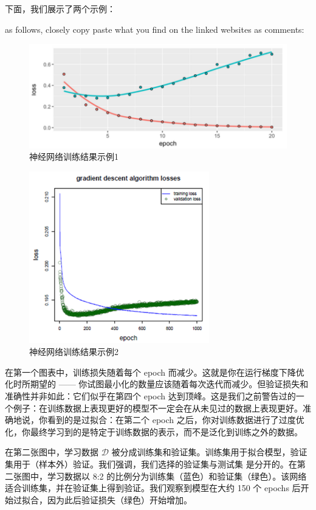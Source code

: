 \documentclass[
]{article}
\begin{document}
下面，我们展示了两个示例：

as follows, closely copy paste what you find on the linked websites as
comments:

\begin{figure}
\centering
\includegraphics{./Figs/Case2/Case2-Fig3.png}
\caption{神经网络训练结果示例1}
\end{figure}

\begin{figure}
\centering
\includegraphics{./Figs/Case2/Case2-Fig4.png}
\caption{神经网络训练结果示例2}
\end{figure}

在第一个图表中，训练损失随着每个 epoch
而减少。这就是你在运行梯度下降优化时所期望的 ------
你试图最小化的数量应该随着每次迭代而减少。但验证损失和准确性并非如此：它们似乎在第四个
epoch
达到顶峰。这是我们之前警告过的一个例子：在训练数据上表现更好的模型不一定会在从未见过的数据上表现更好。准确地说，你看到的是过拟合：在第二个
epoch
之后，你对训练数据进行了过度优化，你最终学习到的是特定于训练数据的表示，而不是泛化到训练之外的数据。

在第二张图中，学习数据 \(\mathcal{D}\)
被分成训练集和验证集。训练集用于拟合模型，验证集用于（样本外）验证。我们强调，我们选择的验证集与测试集
是分开的。在第二张图中，学习数据以 8:2
的比例分为训练集（蓝色）和验证集（绿色）。该网络适合训练集，并在验证集上得到验证。我们观察到模型在大约
150 个 epochs 后开始过拟合，因为此后验证损失（绿色）开始增加。
\end{document}
